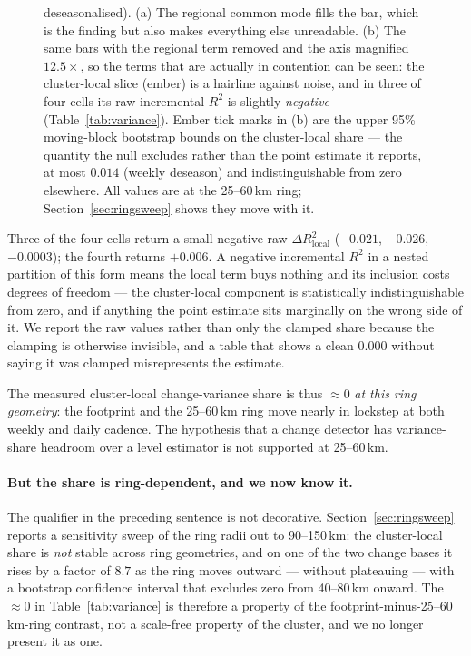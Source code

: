 \documentclass[11pt,a4paper]{article}
\begin{document}
\begin{figure}[t]
{deseasonalised). (a) The regional common mode fills the bar, which is the finding but also makes
everything else unreadable. (b) The same bars with the regional term removed and the axis
magnified $12.5\times$, so the terms that are actually in contention can be seen: the
cluster-local slice (ember) is a hairline against noise, and in three of four cells its raw
incremental $R^2$ is slightly \emph{negative} (Table~\ref{tab:variance}). Ember tick marks in (b)
are the upper 95\% moving-block bootstrap bounds on the cluster-local share --- the quantity the
null excludes rather than the point estimate it reports, at most $0.014$ (weekly deseason) and
indistinguishable from zero elsewhere. All values are at the 25--60\,km ring;
Section~\ref{sec:ringsweep} shows they move with it.}
\label{fig:variance}
\end{figure}

Three of the four cells return a small negative raw $\Delta R^2_{\text{local}}$
($-0.021$, $-0.026$, $-0.0003$); the fourth returns $+0.006$. A negative incremental $R^2$ in a
nested partition of this form means the local term buys nothing and its inclusion costs degrees
of freedom --- the cluster-local component is statistically indistinguishable from zero, and if
anything the point estimate sits marginally on the wrong side of it. We report the raw values
rather than only the clamped share because the clamping is otherwise invisible, and a table that
shows a clean $0.000$ without saying it was clamped misrepresents the estimate.

The measured cluster-local change-variance share is thus $\approx0$ \emph{at this ring geometry}:
the footprint and the 25--60\,km ring move nearly in lockstep at both weekly and daily cadence. The
hypothesis that a change detector has variance-share headroom over a level estimator is not
supported at 25--60\,km.

\paragraph{But the share is ring-dependent, and we now know it.} The qualifier in the preceding
sentence is not decorative. Section~\ref{sec:ringsweep} reports a sensitivity sweep of the ring
radii out to 90--150\,km: the cluster-local share is \emph{not} stable across ring geometries, and
on one of the two change bases it rises by a factor of $8.7$ as the ring moves outward --- without
plateauing --- with a bootstrap confidence interval that excludes zero from 40--80\,km onward. The $\approx0$ in Table~\ref{tab:variance} is
therefore a property of the footprint-minus-25--60\,km-ring contrast, not a scale-free property of
the cluster, and we no longer present it as one.
\end{document}
